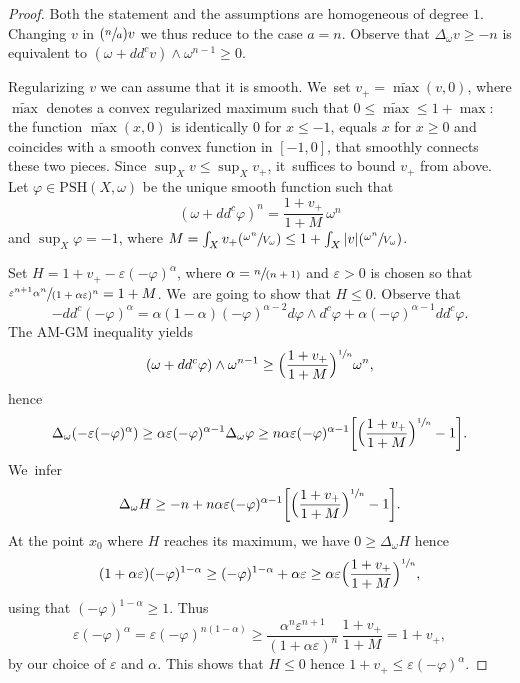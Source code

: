 \documentclass[JEP,XML,SOM,Unicode,published]{cedram}
\newcommand{\Psfrac}[2]{(\sfrac{#1}{#2})}
\newcommand{\spfrac}[2]{\sfrac{#1}{(#2)}}
\theoremstyle{definition}
\let\e\varepsilon
\let\f\varphi
\newcommand \PSH {\mathrm{PSH}}
\begin{document}
\begin{proof}
Both the statement and the assumptions are homogeneous of degree $1$.
Changing $v$ in $\Psfrac{n}{a} v$ we thus reduce to the case $a=n$.
Observe that $\Delta_{\omega} v \geq -n$ is equivalent to $(\omega+dd^c v) \wedge \omega^{n-1} \geq 0$.

Regularizing $v$ we can assume that it is smooth. We~set $v_+=\widetilde{\max}(v,0)$, where
$\widetilde{\max}$ denotes a convex regularized maximum such that $0\leq \widetilde{\max} \leq 1+ \max$:
the function $\widetilde{\max}(x,0)$ is identically $0$ for $x \leq -1$, equals $x$ for $x \geq 0$ and
coincides with a smooth convex function in $[-1,0]$, that smoothly connects these two pieces.
Since $\sup_X v \leq \sup_X v_+$, it~suffices to bound $v_+$ from above.
Let $\f \in\PSH(X,\omega)$ be the unique smooth function such that\vspace*{-3pt}
\[
(\omega+dd^c \f)^n=\frac{1+v_+}{1+M}\, \omega^n
\]
and $\sup_X \f=-1$, where
$M=\int_X v_+ \Psfrac{\omega^n}{V_\omega} \leq 1+ \int_X |v| \Psfrac{\omega^n}{V_\omega}$.

Set $H=1+v_+-\e (-\f)^{\alpha}$, where $\alpha=\spfrac{n}{n+1}$ and
$\e>0$ is chosen so that $\sfrac{\e^{n+1}\alpha^n}{(1+\alpha \e)^n}=1+M$. We~are going to show that $H \leq 0$.
Observe that
\[
-dd^c (-\f)^{\alpha}=\alpha(1-\alpha) (-\f)^{\alpha-2} d\f \wedge d^c \f +\alpha(-\f)^{\alpha-1} dd^c \f.
\]
The AM-GM inequality yields\vspace*{-3pt}
\[
(\omega+dd^c \f) \wedge \omega^{n-1} \geq \Bigl(\frac{1+v_+}{1+M} \Bigr)^{\sfrac{1}{n}} \omega^n,
\]
hence\vspace*{-3pt}
\[
\Delta_{\omega}(-\e (-\f)^{\alpha}) \geq \alpha \e(-\f)^{\alpha-1} \Delta_{\omega} \f
\geq n \alpha \e(-\f)^{\alpha-1} \biggl[ \Bigl(\frac{1+v_+}{1+M} \Bigr)^{\sfrac{1}{n}} -1 \biggr].
\]
We~infer
\[
\Delta_{\omega}H \geq -n+n \alpha \e(-\f)^{\alpha-1} \biggl[ \Bigl(\frac{1+v_+}{1+M} \Bigr)^{\sfrac{1}{n}} -1 \biggr].
\]
At the point $x_0$ where $H$ reaches its maximum, we have $0 \geq \Delta_{\omega}H $ hence
\[
(1+\alpha \e)(-\f)^{1-\alpha} \geq (-\f)^{1-\alpha}+\alpha \e \geq
\alpha \e \Bigl(\frac{1+v_+}{1+M} \Bigr)^{\sfrac{1}{n}},
\]
using that $(-\f)^{1-\alpha} \geq 1$. Thus
\[
\e (-\f)^{\alpha}=\e (-\f)^{n(1-\alpha)} \geq \frac{\alpha^n \e^{n+1}}{(1+\alpha \e)^n}\, \frac{1+v_+}{1+M}=1+v_+,
\]
by our choice of $\e$ and $\alpha$. This shows that $H \leq 0$
hence $1+v_+ \leq \e (-\f)^{\alpha}$.


\end{proof}
\end{document}
